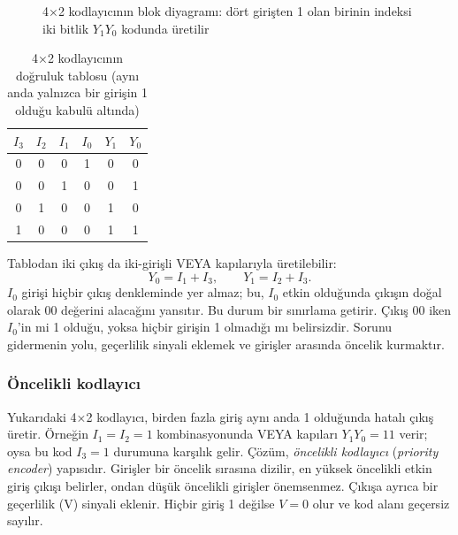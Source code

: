 \begin{figure}[H]
\centering
{}
\caption[4×2 kodlayıcının blok diyagramı]{4×2 kodlayıcının blok diyagramı: dört girişten 1 olan birinin indeksi iki bitlik $Y_1 Y_0$ kodunda üretilir}
\label{fig:B.encoder-4to2}
\end{figure}

\begin{table}[H]
\centering
\caption[4×2 kodlayıcının doğruluk tablosu]{4×2 kodlayıcının doğruluk tablosu (aynı anda yalnızca bir girişin 1 olduğu kabulü altında)}
\label{tab:B.encoder-4to2}
\small
\begin{tabular}{cccc|cc}
\toprule
$I_3$ & $I_2$ & $I_1$ & $I_0$ & $Y_1$ & $Y_0$ \\
\midrule
0 & 0 & 0 & 1 & 0 & 0 \\
0 & 0 & 1 & 0 & 0 & 1 \\
0 & 1 & 0 & 0 & 1 & 0 \\
1 & 0 & 0 & 0 & 1 & 1 \\
\bottomrule
\end{tabular}
\end{table}

Tablodan iki çıkış da iki-girişli VEYA kapılarıyla üretilebilir:
\[ Y_0 = I_1 + I_3, \qquad Y_1 = I_2 + I_3. \]
$I_0$ girişi hiçbir çıkış denkleminde yer almaz; bu, $I_0$ etkin olduğunda çıkışın doğal olarak $00$ değerini alacağını yansıtır. Bu durum bir sınırlama getirir. Çıkış $00$ iken $I_0$'in mi 1 olduğu, yoksa hiçbir girişin 1 olmadığı mı belirsizdir. Sorunu gidermenin yolu, geçerlilik sinyali eklemek ve girişler arasında öncelik kurmaktır.

\subsubsection{Öncelikli kodlayıcı}
Yukarıdaki 4×2 kodlayıcı, birden fazla giriş aynı anda 1 olduğunda hatalı çıkış üretir. Örneğin $I_1 = I_2 = 1$ kombinasyonunda VEYA kapıları $Y_1 Y_0 = 11$ verir; oysa bu kod $I_3 = 1$ durumuna karşılık gelir. Çözüm, \emph{öncelikli kodlayıcı} (\emph{priority encoder}) yapısıdır. Girişler bir öncelik sırasına dizilir, en yüksek öncelikli etkin giriş çıkışı belirler, ondan düşük öncelikli girişler önemsenmez. Çıkışa ayrıca bir geçerlilik (V) sinyali eklenir. Hiçbir giriş 1 değilse $V = 0$ olur ve kod alanı geçersiz sayılır.


